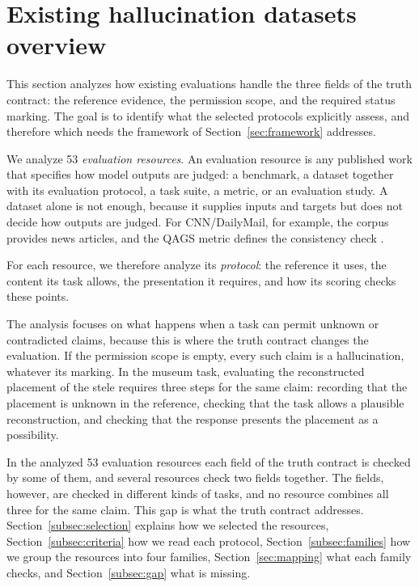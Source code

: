 \documentclass{clv2025}
\begin{document}
\section{Existing hallucination datasets overview}\label{sec:methodology}

This section analyzes how existing evaluations handle the three fields of
the truth contract: the reference evidence, the permission scope, and the
required status marking. The goal is to identify what the selected protocols
explicitly assess, and therefore which needs the framework of
Section~\ref{sec:framework} addresses.

We analyze 53 \emph{evaluation resources}. An evaluation resource is any
published work that specifies how model outputs are judged: a benchmark, a
dataset together with its evaluation protocol, a task suite, a metric, or
an evaluation study. A dataset alone is not enough, because it supplies
inputs and targets but does not decide how outputs are judged. For
CNN/DailyMail, for example, the corpus provides news articles, and the QAGS
metric defines the consistency check \citep{hermann_teaching_2015,
wang_asking_2020}. 

For each resource, we therefore analyze its
\emph{protocol}: the reference it uses, the content its task allows, the
presentation it requires, and how its scoring checks these points.

The analysis focuses on what happens when a task can permit unknown or
contradicted claims, because this is where the truth contract changes the
evaluation. If the permission scope is empty, every such claim is a
hallucination, whatever its marking. In the museum task, evaluating the
reconstructed placement of the stele requires three steps for the same
claim: recording that the placement is unknown in the reference, checking
that the task allows a plausible reconstruction, and checking that the
response presents the placement as a possibility.

In the analyzed 53 evaluation resources each field of the truth contract is
checked by some of them, and several resources check two fields together.
The fields, however, are checked in different kinds of tasks, and no
resource combines all three for the same claim. This gap is what the truth
contract addresses. Section~\ref{subsec:selection} explains how we selected
the resources, Section~\ref{subsec:criteria} how we read each protocol,
Section~\ref{subsec:families} how we group the resources into four
families, Section~\ref{sec:mapping} what each family checks, and
Section~\ref{subsec:gap} what is missing.
\end{document}
